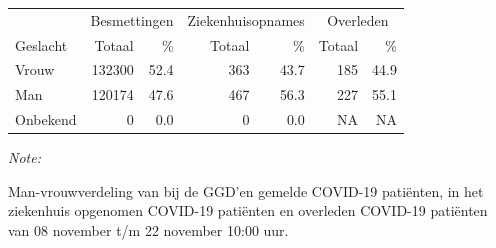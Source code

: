 \documentclass[
  english,
  man,floatsintext]{apa6}
\begin{document}
\begin{table}
\centering\begingroup\fontsize{11}{13}\selectfont

\begin{threeparttable}
\begin{tabular}{lrrrrrr}
\toprule
\multicolumn{1}{c}{ } & \multicolumn{2}{c}{Besmettingen} & \multicolumn{2}{c}{Ziekenhuisopnames} & \multicolumn{2}{c}{Overleden} \\
\cmidrule(l{3pt}r{3pt}){2-3} \cmidrule(l{3pt}r{3pt}){4-5} \cmidrule(l{3pt}r{3pt}){6-7}
Geslacht & Totaal & \% & Totaal & \% & Totaal & \%\\
\midrule
Vrouw & 132300 & 52.4 & 363 & 43.7 & 185 & 44.9\\
Man & 120174 & 47.6 & 467 & 56.3 & 227 & 55.1\\
Onbekend & 0 & 0.0 & 0 & 0.0 & NA & NA\\
\bottomrule
\end{tabular}
\begin{tablenotes}
\item \textit{Note: } 
\item Man-vrouwverdeling van bij de GGD’en gemelde COVID-19 patiënten, in het ziekenhuis opgenomen COVID-19 patiënten en overleden COVID-19 patiënten van 08 november t/m 22 november 10:00 uur.
\end{tablenotes}
\end{threeparttable}
\endgroup{}
\end{table}
\newpage
\end{document}
